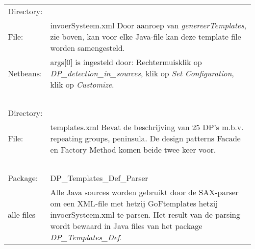 \documentclass[12pt,a4paper]{report}
\begin{document}
\begin{flushleft}
\begin{tabular} {l p{12cm}}
Directory:   & \\
File:        & invoerSysteem.xml \newline 
               Door aanroep van \emph{genereerTemplates}, zie boven,  kan voor elke Java-file
               kan deze template file worden samengesteld. \\
Netbeans:    & args[0] is ingesteld door: \newline
               Rechtermuisklik op \emph{DP\_detection\_in\_sources},
               klik op \emph{Set Configuration}, klik op  \emph{Customize}. \\
\ \\
Directory:   & \\
File:        & templates.xml  \newline
               Bevat de beschrijving van 25 DP's m.b.v. repeating groups, peninsula. \newline
               De design patterns Facade en Factory Method komen beide twee keer voor. \\
\ \\            
Package:     & DP\_Templates\_Def\_Parser \\
alle files   & Alle Java sources worden gebruikt door de SAX-parser om een XML-file met \newline
               hetzij  GoF\-templates  hetzij invoerSysteem.xml te parsen. \newline
               Het result van de parsing wordt bewaard in Java files van het package 
               \emph{DP\_Templates\_Def}.
\end{tabular}
\end{flushleft}
\end{document}
